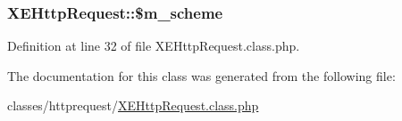 \subsubsection[{\texorpdfstring{\$m\+\_\+scheme}{$m_scheme}}]{\setlength{\rightskip}{0pt plus 5cm}X\+E\+Http\+Request\+::\$m\+\_\+scheme}\hypertarget{classXEHttpRequest_a501919f00934ef2cc76300fa32c2f19d}{}\label{classXEHttpRequest_a501919f00934ef2cc76300fa32c2f19d}


Definition at line 32 of file X\+E\+Http\+Request.\+class.\+php.



The documentation for this class was generated from the following file\+:\begin{DoxyCompactItemize}
\item 
classes/httprequest/\hyperlink{XEHttpRequest_8class_8php}{X\+E\+Http\+Request.\+class.\+php}\end{DoxyCompactItemize}
